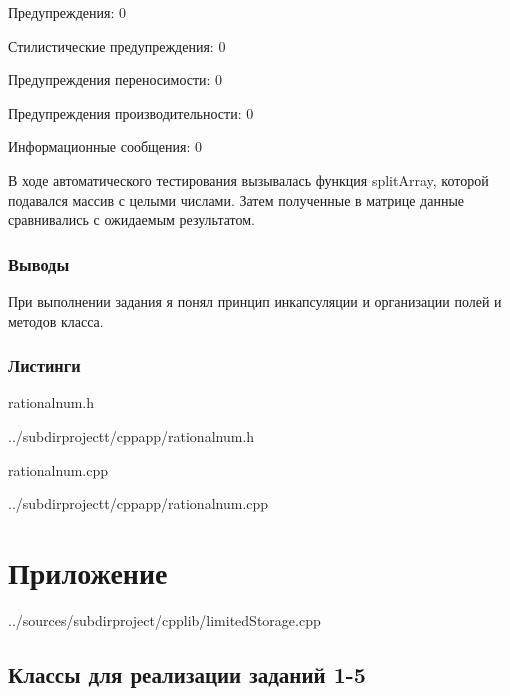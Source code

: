 \documentclass[12pt,a4paper]{report}
\begin{document}
Предупреждения:	0

Стилистические предупреждения:	0

Предупреждения переносимости:	0

Предупреждения производительности:	0

Информационные сообщения:	0




\vspace{\baselineskip}


В ходе автоматического тестирования вызывалась функция splitArray, которой подавался массив с целыми числами. Затем полученные в матрице данные сравнивались с ожидаемым результатом. 


\subsection{Выводы}

При выполнении задания я понял принцип инкапсуляции и организации полей и методов класса.

\subsection*{Листинги}
rationalnum.h

{../subdirprojectt/cppapp/rationalnum.h}

\vspace{\baselineskip}

rationalnum.cpp

{../subdirprojectt/cppapp/rationalnum.cpp}

\chapter {Приложение}../sources/subdirproject/cpplib/limitedStorage.cpp
\section{Классы для реализации заданий 1-5}
\end{document}
